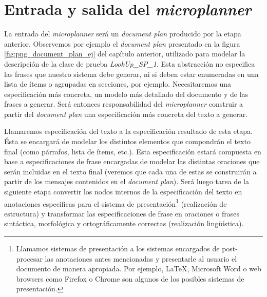 

\section{Entrada y salida del \textit{microplanner}}
La entrada del \textit{microplanner} será un \textit{document plan} producido por la etapa anterior. Observemos por ejemplo el \textit{document plan} presentado en la figura \ref{fig:png_document_plan_ej} del capítulo anterior, utilizado para modelar la descripción de la clase de prueba \emph{LookUp\_SP\_1}. Esta abstracción no especifica las frases que nuestro sistema debe generar, ni si deben estar enumeradas en una lista de ítems o agrupadas en secciones, por ejemplo. Necesitaremos una especificación más concreta, un modelo más detallado del documento y de las frases a generar. Será entonces responsabilidad del \textit{microplanner}  construir a partir del \textit{document plan} una especificación más concreta del texto a generar.

Llamaremos especificación del texto a la especificación resultado de esta etapa. Ésta se encargará de modelar los distintos elementos que compondrán el texto final (como párrafos, lista de ítems, etc.). Esta especificación estará compuesta en base a especificaciones de frase encargadas de modelar las distintas oraciones que serán incluidas en el texto final (veremos que cada una de estas se construirán a partir de los mensajes contenidos en el \textit{document plan}). Será luego tarea de la siguiente etapa convertir los nodos internos de la especificación del texto en anotaciones especificas para el sistema de presentación\footnote{Llamamos sistemas de presentación a los sistemas encargados de post-procesar las anotaciones antes mencionadas y presentarle al usuario el documento de manera apropiada. Por ejemplo, \LaTeX, Microsoft Word o web browsers como Firefox o Chrome son algunos de los posibles sistemas de presentación.} (realización de estructura) y transformar las especificaciones de frase en oraciones o frases sintáctica, morfológica y ortográficamente correctas (realización lingüística). 



